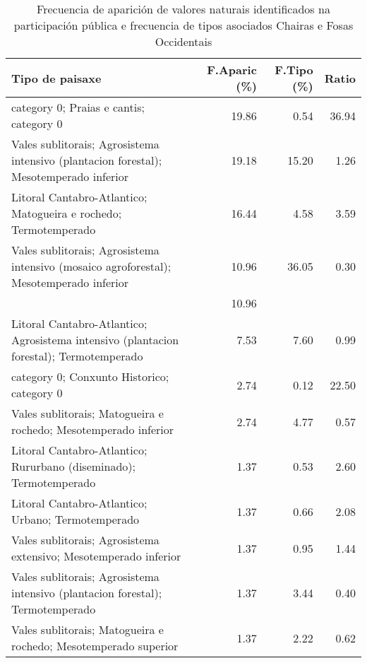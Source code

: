 \begin{table}[p]
\centering
\caption{Frecuencia de aparición de valores naturais identificados na participación pública e frecuencia de tipos asociados Chairas e Fosas Occidentais} 
\label{vsixotnat11}
\begin{tabular}{lrrr}
  \hline
Tipo de paisaxe & F.Aparic (\%) & F.Tipo (\%) & Ratio \\ 
  \hline
category 0; Praias e cantis; category 0 & 19.86 & 0.54 & 36.94 \\ 
  Vales sublitorais; Agrosistema intensivo (plantacion forestal); Mesotemperado inferior & 19.18 & 15.20 & 1.26 \\ 
  Litoral Cantabro-Atlantico; Matogueira e rochedo; Termotemperado & 16.44 & 4.58 & 3.59 \\ 
  Vales sublitorais; Agrosistema intensivo (mosaico agroforestal); Mesotemperado inferior & 10.96 & 36.05 & 0.30 \\ 
   & 10.96 &  &  \\ 
  Litoral Cantabro-Atlantico; Agrosistema intensivo (plantacion forestal); Termotemperado & 7.53 & 7.60 & 0.99 \\ 
  category 0; Conxunto Historico; category 0 & 2.74 & 0.12 & 22.50 \\ 
  Vales sublitorais; Matogueira e rochedo; Mesotemperado inferior & 2.74 & 4.77 & 0.57 \\ 
  Litoral Cantabro-Atlantico; Rururbano (diseminado); Termotemperado & 1.37 & 0.53 & 2.60 \\ 
  Litoral Cantabro-Atlantico; Urbano; Termotemperado & 1.37 & 0.66 & 2.08 \\ 
  Vales sublitorais; Agrosistema extensivo; Mesotemperado inferior & 1.37 & 0.95 & 1.44 \\ 
  Vales sublitorais; Agrosistema intensivo (plantacion forestal); Termotemperado & 1.37 & 3.44 & 0.40 \\ 
  Vales sublitorais; Matogueira e rochedo; Mesotemperado superior & 1.37 & 2.22 & 0.62 \\ 
   \hline
\end{tabular}
\end{table}
